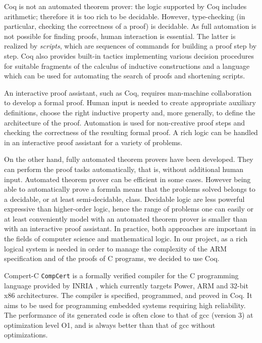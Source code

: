 \documentclass[twocolumn]{article}
\makeatletter
\def\subsection{\@startsection {subsection}{2}{\z@}{16pt plus 2pt minus 2pt}
{6pt plus 2pt minus 2pt}{\normalsize\sl
\edef\@svsec{\thesubsection.\ }}}
\def\thesubsection{\Alph{subsection}}
\newcommand{\compcert}{\texttt{CompCert}\xspace}
\makeatother
\begin{document}
Coq is not an automated theorem prover: the logic supported by Coq
includes arithmetic; therefore it is too rich to be decidable.
However, type-checking (in particular, checking the correctness of a
proof) is decidable.  As full automation is not possible for finding
proofs, human interaction is essential.  The latter is realized by
\emph{scripts}, which are sequences of commands for building a proof
step by step.  Coq also provides built-in tactics implementing various
decision procedures for suitable fragments of the calculus of
inductive constructions and a language 
which can
be used for automating the search of proofs and shortening scripts.

An interactive proof assistant, such as Coq, requires man-machine
collaboration to develop a formal proof.  Human input is needed to
create appropriate auxiliary definitions, choose the right inductive
property and, more generally, to define the architecture of the proof.
Automation is used for non-creative proof steps and checking the
correctness of the resulting formal proof.  A rich logic can be
handled in an interactive proof assistant for a variety of problems.

On the other hand, fully automated theorem provers have been
developed.  They can perform the proof tasks automatically, that is,
without additional human input.  Automated theorem prover can be
efficient in some cases.  However being able to automatically prove a
formula means that the problems solved belongs to a decidable, or at
least semi-decidable, class. Decidable logic are less powerful
expressive than higher-order logic, hence the range of
problems one can easily or at least conveniently model 
with an automated theorem prover is smaller
than with an interactive proof assistant.  In practice, both
approaches are important in the fields of computer science and
mathematical logic.  In our project, as a rich logical system is
needed in order to manage the complexity of the ARM specification and
of the proofs of C programs, we decided to use Coq.

\subsection{Compert-C}
\compcert is a formally verified compiler for the C programming
language provided by INRIA \cite{ccc, Leroy-Compcert-CACM}, which
currently targets Power, ARM and 32-bit x86 architectures.  The
compiler is specified, programmed, and proved in Coq. It aims to be
used for programming embedded systems requiring high reliability. The
performance of its generated code is often close to that of gcc
(version 3) at optimization level O1, and is always better than that
of gcc without optimizations.
\end{document}
